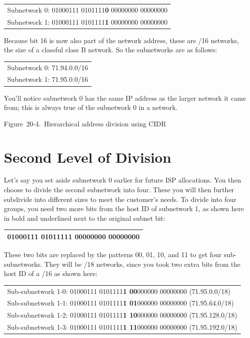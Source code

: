 \begin{longtable}[]{@{}l@{}}
\toprule
\endhead
Subnetwork 0: 01000111 0101111{\textbf{0}} 00000000
00000000\tabularnewline
Subnetwork 1: 01000111 0101111{\textbf{1}} 00000000
00000000\tabularnewline
\bottomrule
\end{longtable}

Because bit 16 is now also part of the network address, these are /16
networks, the size of a classful class B network. So the subnetworks are
as follows:

\begin{longtable}[]{@{}l@{}}
\toprule
\endhead
Subnetwork 0: 71.94.0.0/16\tabularnewline
Subnetwork 1: 71.95.0.0/16\tabularnewline
\bottomrule
\end{longtable}

You'll notice subnetwork 0 has the same IP address as the larger network
it came from; this is always true of the subnetwork 0 in a network.





Figure~20-4.~Hierarchical address division using CIDR

\section{Second Level of Division}

Let's say you set aside subnetwork 0 earlier for future ISP allocations.
You then choose to divide the second subnetwork into four. These you
will then further subdivide into different sizes to meet the customer's
needs. To divide into four groups, you need two more bits from the host
ID of subnetwork 1, as shown here in bold and underlined next to the
original subnet bit:

\begin{longtable}[]{@{}l@{}}
\toprule
\endhead
01000111 0101111{\textbf{1 {00}}}000000 00000000\tabularnewline
\bottomrule
\end{longtable}

These two bits are replaced by the patterns 00, 01, 10, and 11 to get
four sub-subnetworks. They will be /18 networks, since you took two
extra bits from the host ID of a /16 as shown here:

\begin{longtable}[]{@{}l@{}}
\toprule
\endhead
Sub-subnetwork 1-0: 01000111 0101111{\textbf{1 {00}}}000000 00000000
(71.95.0.0/18)\tabularnewline
Sub-subnetwork 1-1: 01000111 0101111{\textbf{1 {01}}}000000 00000000
(71.95.64.0/18)\tabularnewline
Sub-subnetwork 1-2: 01000111 0101111{\textbf{1 {10}}}000000 00000000
(71.95.128.0/18)\tabularnewline
Sub-subnetwork 1-3: 01000111 0101111{\textbf{1 {11}}}000000 00000000
(71.95.192.0/18)\tabularnewline
\bottomrule
\end{longtable}

